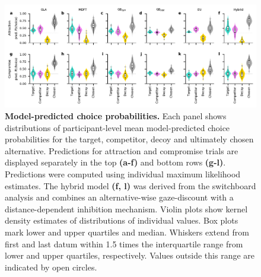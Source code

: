 \documentclass[11pt, a4paper]{article}
\begin{document}
\begin{refsection}
\begin{figure}[ht!]
\begin{centering}
\includegraphics[scale=1]{../figures/S_model-predicted-choiceprobs.pdf}
\caption{\textbf{Model-predicted choice probabilities.} Each panel shows distributions of participant-level mean model-predicted choice probabilities for the target, competitor, decoy and ultimately chosen alternative. Predictions for attraction and compromise trials are displayed separately in the top \textbf{(a-f)} and bottom rows \textbf{(g-l)}. Predictions were computed using individual maximum likelihood estimates. The hybrid model \textbf{(f, l)} was derived from the switchboard analysis and combines an alternative-wise gaze-discount with a distance-dependent inhibition mechanism. Violin plots show kernel density estimates of distributions of individual values. Box plots mark lower and upper quartiles and median. Whiskers extend from first and last datum within 1.5 times the interquartile range from lower and upper quartiles, respectively. Values outside this range are indicated by open circles.}
\label{fig:model-pred-probs}
\end{centering}
\end{figure}
\clearpage


\end{refsection}
\end{document}

